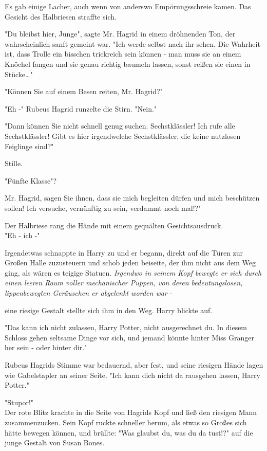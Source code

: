 {Es gab einige Lacher, auch wenn von anderswo Empörungsschreie kamen. Das Gesicht des Halbriesen straffte sich.

"Du bleibst hier, Junge", sagte Mr. Hagrid in einem dröhnenden Ton, der wahrscheinlich sanft gemeint war. "Ich werde selbst nach ihr sehen. Die Wahrheit ist, dass Trolle ein bisschen trickreich sein können - man muss sie an einem Knöchel fangen und sie genau richtig baumeln lassen, sonst reißen sie einen in Stücke…"

"Können Sie auf einem Besen reiten, Mr. Hagrid?"

"Eh -" Rubeus Hagrid runzelte die Stirn. "Nein."

"Dann können Sie nicht schnell genug suchen. Sechstklässler! Ich rufe alle Sechstklässler! Gibt es hier irgendwelche Sechstklässler, die keine nutzlosen Feiglinge sind?"

Stille.

"Fünfte Klasse"?

Mr. Hagrid, sagen Sie ihnen, dass sie mich begleiten dürfen und mich beschützen sollen! Ich versuche, vernünftig zu sein, verdammt noch mal!?"

Der Halbriese rang die Hände mit einem gequälten Gesichtsausdruck.\\ "Eh - ich -"

Irgendetwas schnappte in Harry zu und er begann, direkt auf die Türen zur Großen Halle zuzusteuern und schob jeden beiseite, der ihm nicht aus dem Weg ging, als wären es teigige Statuen. \emph{Irgendwo in seinem Kopf bewegte er sich durch einen leeren Raum voller mechanischer Puppen, von deren bedeutungslosen, lippenbewegten Geräuschen er abgelenkt worden war} -

eine riesige Gestalt stellte sich ihm in den Weg. Harry blickte auf.

"Das kann ich nicht zulassen, Harry Potter, nicht ausgerechnet du. In diesem Schloss gehen seltsame Dinge vor sich, und jemand könnte hinter Miss Granger her sein - oder hinter dir."

Rubeus Hagrids Stimme war bedauernd, aber fest, und seine riesigen Hände lagen wie Gabelstapler an seiner Seite. "Ich kann dich nicht da rausgehen lassen, Harry Potter."

"Stupor!"\\ Der rote Blitz krachte in die Seite von Hagrids Kopf und ließ den riesigen Mann zusammenzucken. Sein Kopf ruckte schneller herum, als etwas so Großes sich hätte bewegen können, und brüllte: "Was glaubst du, was du da tust!?" auf die junge Gestalt von Susan Bones.

}
